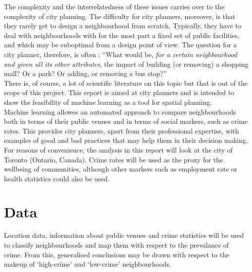 \documentclass{article}
\begin{document}
The complexity and the interrelatedness of these issues carries over to the complexity of city planning. The difficulty for city planners, moreover, is that they rarely get to design a neighbourhood from scratch. Typically, they have to deal with neighbourhoods with for the most part a fixed set of public facilities, and which may be suboptimal from a design point of view. The question for a city planner, therefore, is often : ``What would be, \emph{for a certain neighbourhood and given all its other attributes}, the impact of building (or removing) a shopping mall? Or a park? Or adding, or removing a bus stop?''\\

There is, of course, a lot of scientific literature on this topic but that is out of the scope of this project. This report is aimed at city planners and is intended to show the feasibility of machine learning as a tool for spatial planning.\\
Machine learning allowes an automated approach to compare neighbourhoods both in terms of their public venues and in terms of social markers, such as crime rates. This provides city planners, apart from their professional expertise, with examples of good and bad practices that may help them in their decision making.\\
For reasons of convenience, the analysis in this report will look at the city of Toronto (Ontario, Canada). Crime rates will be used as the proxy for the wellbeing of communities, although other markers such as employment rate or health statistics could also be used.

\section{Data}
Location data, information about public venues and crime statistics will be used to classify neighbourhoods and map them with respect to the prevalance of crime. From this, generalised conclusions may be drawn with respect to the makeup of `high-crime' and `low-crime' neighbourhoods. 
\end{document}
